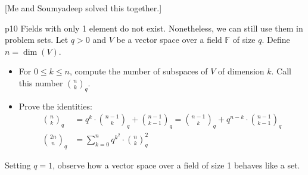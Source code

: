 \documentclass[a4paper, 11pt]{article}
\newcounter{problem}
\begin{document}
[Me and Soumyadeep solved this together.]\parinn

\begin{problem}{%
	}{p10%
	}
Fields with only 1 element do not exist. Nonetheless, we can still use them in problem sets. Let $q>0$ and $V$ be a vector space over a field $\mathbb{F}$ of size $q$. Define $n=\operatorname{dim}(V)$.
\begin{itemize}
	\item For $0 \leq k \leq n$, compute the number of subspaces of $V$ of dimension $k$. Call this number $\binom{n}{k}_q$.
	\item Prove the identities:
	$$
	\begin{aligned}
		\binom{n}{k}_q & =q^k \cdot\binom{n-1}{k}_q+\binom{n-1}{k-1}_q=\binom{n-1}{k}_q+q^{n-k} \cdot\binom{n-1}{k-1}_q \\
		\binom{2 n}{n}_q & =\sum_{k=0}^n q^{k^2} \cdot\binom{n}{k}_q^2
	\end{aligned}
	$$
\end{itemize}

Setting $q=1$, observe how a vector space over a field of size 1 behaves like a set.
\end{problem}
\end{document}

